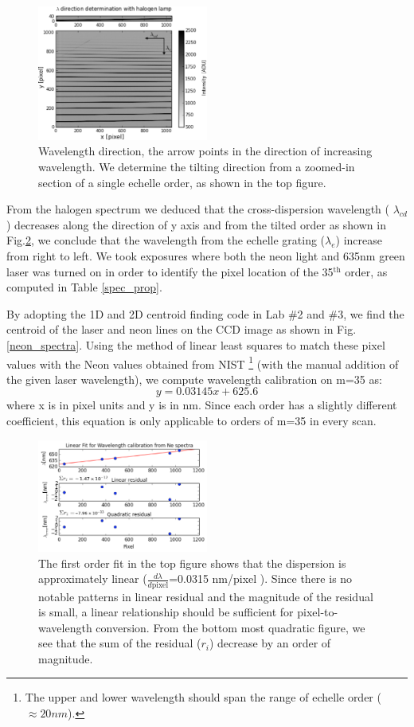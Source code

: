 \documentclass[authoryear, 12pt,5p, times]{elsarticle}
\begin{document}
\begin{figure}[h!]
\includegraphics[width=0.5\textwidth]{figures/lambda_direction}
\caption{Wavelength direction, the arrow points in the direction of increasing wavelength. We determine the tilting direction from a zoomed-in section of a single echelle  order, as shown in the top figure.}
\label{lambda_direction}
\end{figure}
From the halogen spectrum we deduced that the cross-dispersion wavelength ( $\lambda_{cd}$) decreases along the direction of y axis and from the tilted order as shown in Fig.\ref{calib}, we conclude that the wavelength from the echelle grating ($\lambda_{e}$) increase from right to left.
We took exposures where both the neon light and 635nm green laser was turned on in order to identify the pixel location of the 35$^{\text{th}}$ order, as computed in Table \ref{spec_prop}.


By adopting the 1D and 2D centroid finding code in Lab \#2 and \#3, we find the centroid of the laser and neon lines on the CCD image as shown in Fig.\ref{neon_spectra}.  Using the method of linear least squares to match these pixel values with the Neon values obtained from NIST \footnote{The upper and lower wavelength should span the range of echelle order ($\approx 20nm$).} (with the manual addition of the given laser wavelength), we compute wavelength calibration on m=35 as: 
\begin{equation}
y = 0.03145 x + 625.6
\end{equation}
where x is in pixel units and y is in nm. Since each order has a slightly different coefficient, this equation is only applicable to orders of m=35 in every scan. 
 \begin{figure}[h!]
\includegraphics[width=0.5\textwidth]{figures/wavelength_calib}
\caption{The first order fit in the top figure shows that the dispersion is approximately linear ($\frac{d\lambda}{d\text{pixel}}$=0.0315 nm/pixel ). Since there is no notable patterns in linear residual and the magnitude of the residual is small, a linear relationship should be sufficient for pixel-to-wavelength conversion. From the bottom most quadratic figure, we see that the sum of the residual ($r_i$) decrease by an order of magnitude.}
\label{calib}
\end{figure}
\end{document}
